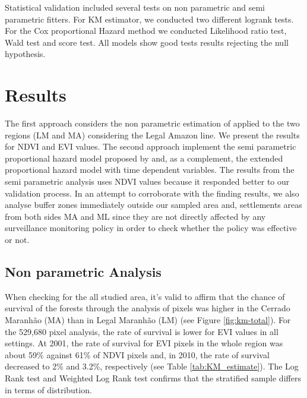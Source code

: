 Statistical validation included several tests on non parametric and semi parametric fitters. For KM estimator, we conducted two different logrank tests. For the Cox proportional Hazard method we conducted Likelihood ratio test, Wald test and score test. All models show good tests results rejecting the null hypothesis. 

\section{Results}  %
\label{S:3}
The first approach considers the non parametric estimation of \citet{kaplanandmeier} applied to the two regions (LM and MA) considering the Legal Amazon line. We present the results for NDVI and EVI values. The second approach implement the semi parametric proportional hazard model proposed by \citet{Cox1972} and, as a complement, the extended proportional hazard model with time dependent variables. The results from the semi parametric analysis uses NDVI values because it responded better to our validation process. In an attempt to corroborate with the finding results, we also analyse buffer zones immediately outside our sampled area and, settlements areas from both sides MA and ML since they are not directly affected by any surveillance monitoring policy in order to check whether the policy was effective or not.

\subsection{Non parametric Analysis} \label{resultssection1}
When checking for the all studied area, it's valid to affirm that the chance of survival of the forests through the analysis of pixels was higher in the Cerrado Maranhão (MA) than in Legal Maranhão (LM) (see Figure \ref{fig:km-total}). For the 529,680 pixel analysis, the rate of survival is lower for EVI values in all settings. At 2001, the rate of survival for EVI pixels in the whole region was about 59\% against 61\% of NDVI pixels and, in 2010, the rate of survival decreased to 2\% and 3.2\%, respectively (see Table \ref{tab:KM_estimate}). The Log Rank test and Weighted Log Rank test confirms that the stratified sample differs in terms of distribution. 

